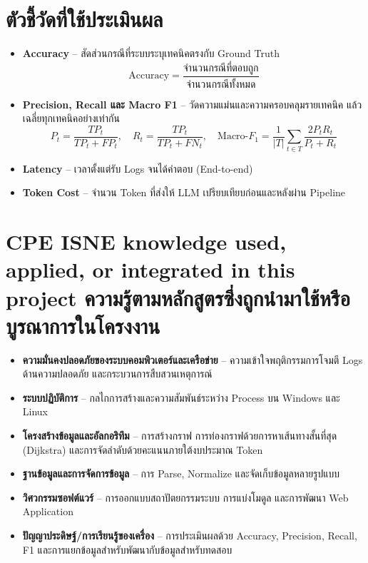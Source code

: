 \section{ตัวชี้วัดที่ใช้ประเมินผล}
\begin{itemize}
  \item \textbf{Accuracy} -- สัดส่วนกรณีที่ระบบระบุเทคนิคตรงกับ Ground Truth
        \begin{equation}
        \mathrm{Accuracy} = \frac{\text{จำนวนกรณีที่ตอบถูก}}{\text{จำนวนกรณีทั้งหมด}}
        \end{equation}
  \item \textbf{Precision, Recall และ Macro F1} -- วัดความแม่นและความครอบคลุมรายเทคนิค
        แล้วเฉลี่ยทุกเทคนิคอย่างเท่ากัน
        \begin{equation}
        P_t = \frac{TP_t}{TP_t+FP_t},\quad
        R_t = \frac{TP_t}{TP_t+FN_t},\quad
        \text{Macro-}F_1 = \frac{1}{|T|}\sum_{t\in T}\frac{2P_tR_t}{P_t+R_t}
        \end{equation}
  \item \textbf{Latency} -- เวลาตั้งแต่รับ Logs จนได้คำตอบ (End-to-end)
  \item \textbf{Token Cost} -- จำนวน Token ที่ส่งให้ LLM เปรียบเทียบก่อนและหลังผ่าน Pipeline
\end{itemize}

\section{\ifenglish%
\ifcpe CPE \else ISNE \fi knowledge used, applied, or integrated in this project
\else%
ความรู้ตามหลักสูตรซึ่งถูกนำมาใช้หรือบูรณาการในโครงงาน
\fi
}
\begin{itemize}
  \item \textbf{ความมั่นคงปลอดภัยของระบบคอมพิวเตอร์และเครือข่าย} -- ความเข้าใจพฤติกรรมการโจมตี
        Logs ด้านความปลอดภัย และกระบวนการสืบสวนเหตุการณ์
  \item \textbf{ระบบปฏิบัติการ} -- กลไกการสร้างและความสัมพันธ์ระหว่าง Process บน Windows และ Linux
  \item \textbf{โครงสร้างข้อมูลและอัลกอริทึม} -- การสร้างกราฟ การท่องกราฟด้วยการหาเส้นทางสั้นที่สุด (Dijkstra)
        และการจัดลำดับด้วยคะแนนภายใต้งบประมาณ Token
  \item \textbf{ฐานข้อมูลและการจัดการข้อมูล} -- การ Parse, Normalize และจัดเก็บข้อมูลหลายรูปแบบ
  \item \textbf{วิศวกรรมซอฟต์แวร์} -- การออกแบบสถาปัตยกรรมระบบ การแบ่งโมดูล และการพัฒนา Web Application
  \item \textbf{ปัญญาประดิษฐ์/การเรียนรู้ของเครื่อง} -- การประเมินผลด้วย Accuracy, Precision, Recall, F1
        และการแยกข้อมูลสำหรับพัฒนากับข้อมูลสำหรับทดสอบ
\end{itemize}


